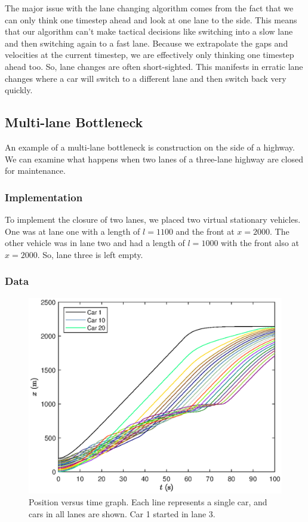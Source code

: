 \documentclass[12pt]{article}
\begin{document}
    The major issue with the lane changing algorithm comes from the fact that we can only think one timestep ahead and look at one lane to the side. This means that our algorithm can't make tactical decisions like switching into a slow lane and then switching again to a fast lane. Because we extrapolate the gaps and velocities at the current timestep, we are effectively only thinking one timestep ahead too. So, lane changes are often short-sighted. This manifests in erratic lane changes where a car will switch to a different lane and then switch back very quickly. 
    
    \subsection{Multi-lane Bottleneck}\label{multi lane bottleneck}
    An example of a multi-lane bottleneck is construction on the side of a highway. We can examine what happens when two lanes of a three-lane highway are closed for maintenance. 
    \subsubsection{Implementation}
    To implement the closure of two lanes, we placed two virtual stationary vehicles. One was at lane one with a length of $l=1100$ and the front at $x=2000$. The other vehicle was in lane two and had a length of $l=1000$ with the front also at $x=2000$. So, lane three is left empty.
    \subsubsection{Data}

    \begin{figure}[H]
      \begin{center}
        \includegraphics[width=13cm]{mlbn_x.eps}
        \caption{Position versus time graph. Each line represents a single car, and cars in all lanes are shown. Car 1 started in lane 3.}
        \label{fig:multi lane x}
      \end{center}
    \end{figure}
\end{document}
